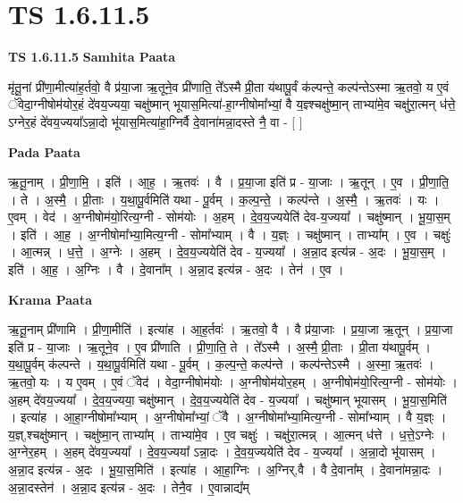 \documentclass[17pt]{extarticle}
\begin{document}
\section*{ TS 1.6.11.5 }

\textbf{TS 1.6.11.5 } \newline
\textbf{Samhita Paata} \newline

मृ॑तू॒नां प्री॑णा॒मीत्या॑ह॒र्तवो॒ वै प्र॑या॒जा ऋ॒तूने॒व प्री॑णाति॒ ते᳚ऽस्मै प्री॒ता य॑थापू॒र्वं क॑ल्पन्ते॒ कल्प॑न्तेऽस्मा ऋ॒तवो॒ य ए॒वं ॅवेदा॒ग्नीषोम॑योर॒हं दे॑वय॒ज्यया॒ चक्षु॑ष्मान् भूयास॒मित्या॑-हा॒ग्नीषोमा᳚भ्यां॒ वै य॒ज्ञ्श्चक्षु॑ष्मा॒न् ताभ्या॑मे॒व चक्षु॑रा॒त्मन् ध॑त्ते॒ ऽग्नेर॒हं दे॑वय॒ज्यया᳚ऽन्ना॒दो भू॑यास॒मित्या॑हा॒ग्निर्वै दे॒वाना॑मन्ना॒दस्ते नै॒ वा - [ ] \newline

\textbf{Pada Paata} \newline

ऋ॒तू॒नाम् । प्री॒णा॒मि॒ । इति॑ । आ॒ह॒ । ऋ॒तवः॑ । वै । प्र॒या॒जा इति॑ प्र - या॒जाः । ऋ॒तून् । ए॒व । प्री॒णा॒ति॒ । ते । अ॒स्मै॒ । प्री॒ताः । य॒था॒पू॒र्वमिति॑ यथा - पू॒र्वम् । क॒ल्प॒न्ते॒ । कल्प॑न्ते । अ॒स्मै॒ । ऋ॒तवः॑ । यः । ए॒वम् । वेद॑ । अ॒ग्नीषोम॑यो॒रित्य॒ग्नी - सोम॑योः । अ॒हम् । दे॒व॒य॒ज्ययेति॑ देव-य॒ज्यया᳚ । चक्षु॑ष्मान् । भू॒या॒स॒म् । इति॑ । आ॒ह॒ । अ॒ग्नीषोमा᳚भ्या॒मित्य॒ग्नी - सोमा᳚भ्याम् । वै । य॒ज्ञ्ः । चक्षु॑ष्मान् । ताभ्या᳚म् । ए॒व । चक्षुः॑ । आ॒त्मन्न् । ध॒त्ते॒ । अ॒ग्नेः । अ॒हम् । दे॒व॒य॒ज्ययेति॑ देव - य॒ज्यया᳚ । अ॒न्ना॒द इत्य॑न्न - अ॒दः । भू॒या॒स॒म् । इति॑ । आ॒ह॒ । अ॒ग्निः । वै । दे॒वाना᳚म् । अ॒न्ना॒द इत्य॑न्न - अ॒दः । तेन॑ । ए॒व ।  \newline


\textbf{Krama Paata} \newline

ऋ॒तू॒नाम् प्री॑णामि । प्री॒णा॒मीति॑ । इत्या॑ह । आ॒ह॒र्तवः॑ । ऋ॒तवो॒ वै । वै प्र॑या॒जाः । प्र॒या॒जा ऋ॒तून् । प्र॒या॒जा इति॑ प्र - या॒जाः । ऋ॒तूने॒व । ए॒व प्री॑णाति । प्री॒णा॒ति॒ ते । ते᳚ऽस्मै । अ॒स्मै॒ प्री॒ताः । प्री॒ता य॑थापू॒र्वम् । य॒था॒पू॒र्वम् क॑ल्पन्ते । य॒था॒पू॒र्वमिति॑ यथा - पू॒र्वम् । क॒ल्प॒न्ते॒ कल्प॑न्ते । कल्प॑न्तेऽस्मै । अ॒स्मा॒ ऋ॒तवः॑ । ऋ॒तवो॒ यः । य ए॒वम् । ए॒वं ॅवेद॑ । वेदा॒ग्नीषोम॑योः । अ॒ग्नीषोम॑योर॒हम् । अ॒ग्नीषोम॑यो॒रित्य॒ग्नी - सोम॑योः । अ॒हम् दे॑वय॒ज्यया᳚ । दे॒व॒य॒ज्यया॒ चक्षु॑ष्मान् । दे॒व॒य॒ज्ययेति॑ देव - य॒ज्यया᳚ । चक्षु॑ष्मान् भूयासम् । भू॒या॒स॒मिति॑ । इत्या॑ह । आ॒हा॒ग्नीषोमा᳚भ्याम् । अ॒ग्नीषोमा᳚भ्यां॒ ॅवै । अ॒ग्नीषोमा᳚भ्या॒मित्य॒ग्नी - सोमा᳚भ्याम् । वै य॒ज्ञ्ः । य॒ज्ञ्,श्चक्षु॑ष्मान् । चक्षु॑ष्मा॒न् ताभ्या᳚म् । ताभ्या॑मे॒व । ए॒व चक्षुः॑ । चक्षु॑रा॒त्मन्न् । आ॒त्मन् ध॑त्ते । ध॒त्ते॒ऽग्नेः । अ॒ग्नेर॒हम् । अ॒हम् दे॑वय॒ज्यया᳚ । दे॒व॒य॒ज्यया᳚ ऽन्ना॒दः । दे॒व॒य॒ज्ययेति॑ देव - य॒ज्यया᳚ । अ॒न्ना॒दो भू॑यासम् । अ॒न्ना॒द इत्य॑न्न - अ॒दः । भू॒या॒स॒मिति॑ । इत्या॑ह । आ॒हा॒ग्निः । अ॒ग्निर्,वै । वै दे॒वाना᳚म् । दे॒वाना॑मन्ना॒दः । अ॒न्ना॒दस्तेन॑ । अ॒न्ना॒द इत्य॑न्न - अ॒दः । तेनै॒व । ए॒वान्नाद्य᳚म् \newline
\end{document}

